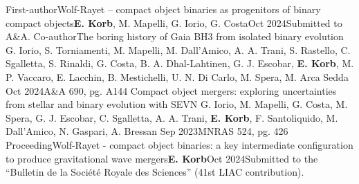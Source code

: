 %
%
%

\begin{experiences}
    \publicationtags
    {First-author}{Wolf-Rayet -- compact object binaries as progenitors of binary compact objects}{\textbf{E. Korb}, M. Mapelli, G. Iorio, G. Costa}{Oct 2024}{Submitted to A\&A.}{}
    \emptySeparator
    \publicationtags
    {Co-author}{The boring history of Gaia BH3 from isolated binary evolution}
    {G. Iorio, S. Torniamenti, M. Mapelli, M. Dall'Amico, A. A. Trani, S. Rastello, C. Sgalletta, S. Rinaldi, G. Costa, B. A. Dhal-Lahtinen, G. J. Escobar, \textbf{E. Korb}, M. P. Vaccaro, E. Lacchin, B. Mestichelli, U. N. Di Carlo, M. Spera, M. Arca Sedda}
    {Oct 2024}{A\&A 690, pg. A144}
    {} 
    \emptySeparator
    \publicationtags
    {}   {Compact object mergers: exploring uncertainties from stellar and binary evolution with SEVN}
    {G. Iorio, M. Mapelli, G. Costa, M. Spera, G. J. Escobar, C. Sgalletta, A. A. Trani, \textbf{E. Korb}, F. Santoliquido, M. Dall'Amico, N. Gaspari, A. Bressan}
    {Sep 2023}{MNRAS 524, pg. 426}
    {}      
    \emptySeparator
    \publicationtags
    {Proceeding}{Wolf-Rayet - compact object binaries: a key intermediate configuration to produce gravitational wave mergers}{\textbf{E. Korb}}{Oct 2024}{Submitted to the ``Bulletin de la Société Royale des Sciences'' (41st LIAC contribution).}{}
    \emptySeparator
\end{experiences}
